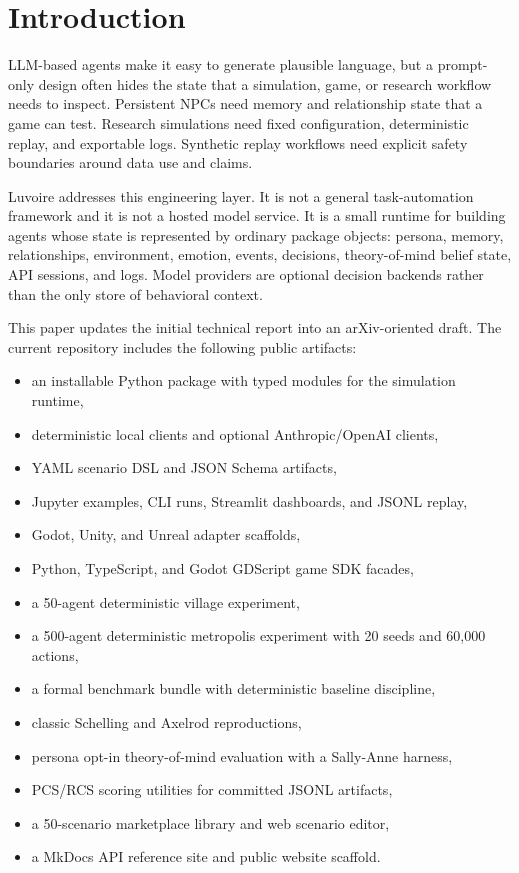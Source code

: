 \section{Introduction}

LLM-based agents make it easy to generate plausible language, but a prompt-only design often hides the state that a simulation, game, or research workflow needs to inspect. Persistent NPCs need memory and relationship state that a game can test. Research simulations need fixed configuration, deterministic replay, and exportable logs. Synthetic replay workflows need explicit safety boundaries around data use and claims.

Luvoire addresses this engineering layer. It is not a general task-automation framework and it is not a hosted model service. It is a small runtime for building agents whose state is represented by ordinary package objects: persona, memory, relationships, environment, emotion, events, decisions, theory-of-mind belief state, API sessions, and logs. Model providers are optional decision backends rather than the only store of behavioral context.

This paper updates the initial technical report into an arXiv-oriented draft. The current repository includes the following public artifacts:

\begin{itemize}
  \item an installable Python package with typed modules for the simulation runtime,
  \item deterministic local clients and optional Anthropic/OpenAI clients,
  \item YAML scenario DSL and JSON Schema artifacts,
  \item Jupyter examples, CLI runs, Streamlit dashboards, and JSONL replay,
  \item Godot, Unity, and Unreal adapter scaffolds,
  \item Python, TypeScript, and Godot GDScript game SDK facades,
  \item a 50-agent deterministic village experiment,
  \item a 500-agent deterministic metropolis experiment with 20 seeds and 60,000 actions,
  \item a formal benchmark bundle with deterministic baseline discipline,
  \item classic Schelling and Axelrod reproductions,
  \item persona opt-in theory-of-mind evaluation with a Sally-Anne harness,
  \item PCS/RCS scoring utilities for committed JSONL artifacts,
  \item a 50-scenario marketplace library and web scenario editor,
  \item a MkDocs API reference site and public website scaffold.
\end{itemize}


